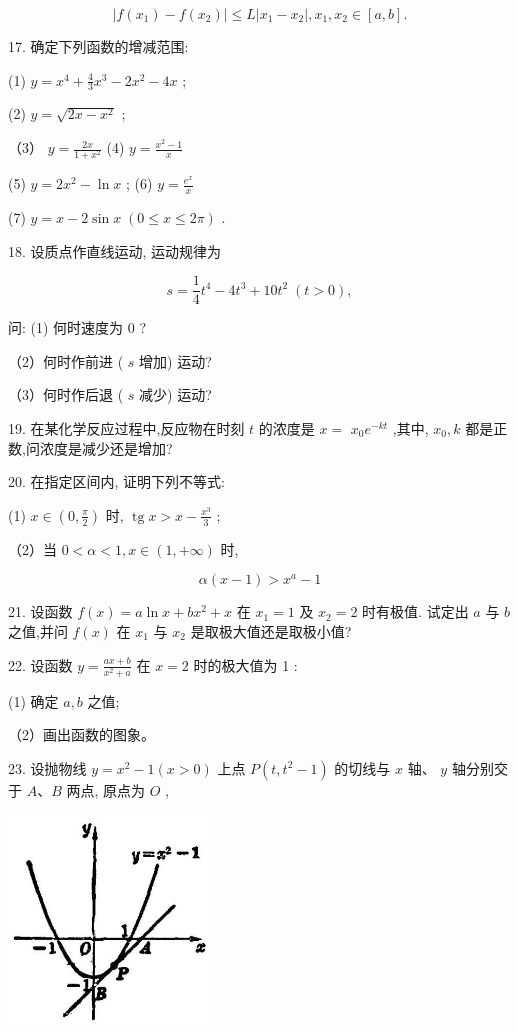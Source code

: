 \documentclass[lang=cn,newtx,10pt,scheme=chinese]{elegantbook}
\begin{document}
\[
\left| {f\left( {x}_{1}\right) - f\left( {x}_{2}\right) }\right| \leq L\left| {{x}_{1} - {x}_{2}}\right| ,{x}_{1},{x}_{2} \in \left\lbrack {a,b}\right\rbrack .
\]

17. 确定下列函数的增减范围:

(1) \(y = {x}^{4} + \frac{4}{3}{x}^{3} - 2{x}^{2} - {4x}\) ;

(2) \(y = \sqrt{{2x} - {x}^{2}}\) ;

（3） \(y = \frac{2x}{1 + {x}^{2}}\) (4) \(y = \frac{{x}^{2} - 1}{x}\)

(5) \(y = 2{x}^{2} - \ln x\) ; (6) \(y = \frac{{e}^{x}}{x}\)

(7) \(y = x - 2\sin x\;\left( {0 \leq x \leq {2\pi }}\right)\) .

18. 设质点作直线运动, 运动规律为

\[
s = \frac{1}{4}{t}^{4} - 4{t}^{3} + {10}{t}^{2}\;\left( {t > 0}\right) ,
\]

问: (1) 何时速度为 \(0\) ?

（2）何时作前进 ( \(s\) 增加) 运动?

（3）何时作后退 ( \(s\) 减少) 运动?

19. 在某化学反应过程中,反应物在时刻 \(t\) 的浓度是 \(x =\) \({x}_{0}{e}^{-{kt}}\) ,其中, \({x}_{0},k\) 都是正数,问浓度是减少还是增加?

20. 在指定区间内, 证明下列不等式:

(1) \(x \in \left( {0,\frac{\pi }{2}}\right)\) 时, \(\operatorname{tg}x > x - \frac{{x}^{3}}{3}\) ;

（2）当 \(0 < \alpha < 1,x \in \left( {1, + \infty }\right)\) 时,

\[
\alpha \left( {x - 1}\right) > {x}^{a} - 1
\]

21. 设函数 \(f\left( x\right) = a\ln x + b{x}^{2} + x\) 在 \({x}_{1} = 1\) 及 \({x}_{2} = 2\) 时有极值. 试定出 \(a\) 与 \(b\) 之值,并问 \(f\left( x\right)\) 在 \({x}_{1}\) 与 \({x}_{2}\) 是取极大值还是取极小值?

22. 设函数 \(y = \frac{{ax} + b}{{x}^{2} + a}\) 在 \(x = 2\) 时的极大值为 1 :

(1) 确定 \(a,b\) 之值;

（2）画出函数的图象。

23. 设抛物线 \(y = {x}^{2} - 1\left( {x > 0}\right)\) 上点 \(P\left( {t,{t}^{2} - 1}\right)\) 的切线与 \(x\) 轴、 \(y\) 轴分别交于 \(A\text{、}B\) 两点, 原点为 \(O\) ,

\begin{center}
\includegraphics[max width=0.4\textwidth]{images/01912c18-5c3f-733d-b775-749ba9897a9d_182_738738.jpg}
\end{center}
\end{document}
